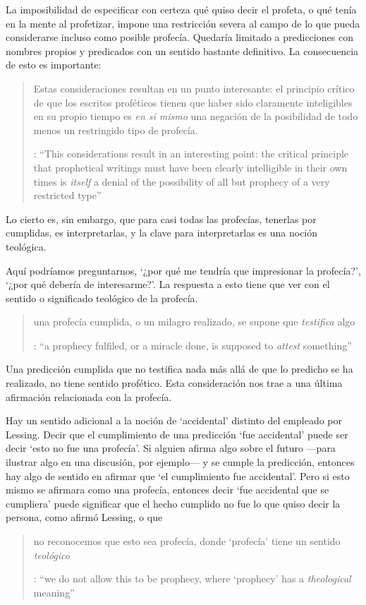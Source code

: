 La imposibilidad de especificar con certeza qué quiso decir el profeta, o qué tenía en la mente al profetizar, impone una restricción severa al campo de lo que pueda considerarse incluso como posible profecía. Quedaría limitado a predicciones con nombres propios y predicados con un sentido bastante definitivo. La consecuencia de esto es importante: \blockquote[{\cite[31]{anscombe2008faith:prophandmi}}: \enquote{This considerations result in an interesting point: the critical principle that prophetical writings must have been clearly intelligible in their own times is \emph{itself} a denial of the possibility of all but prophecy of a very restricted type}]{Estas consideraciones resultan en un punto interesante: el principio crítico de que los escritos proféticos tienen que haber sido claramente inteligibles en su propio tiempo es \emph{en sí mismo} una negación de la posibilidad de todo menos un restringido tipo de profecía.} Lo cierto es, sin embargo, que para casi todas las profecías, tenerlas por cumplidas, es interpretarlas, y la clave para interpretarlas es una noción teológica.

Aquí podríamos preguntarnos, \enquote*{¿por qué me tendría que impresionar la profecía?}, \enquote*{¿por qué debería de interesarme?}. La respuesta a esto tiene que ver con el sentido o significado teológico de la profecía. \blockquote[{\cite[32]{anscombe2008faith:prophandmi}}: \enquote{a prophecy fulfiled, or a miracle done, is supposed to \emph{attest} something}]{una profecía cumplida, o un milagro realizado, se supone que \emph{testifica} algo}. Una predicción cumplida que no testifica nada más allá de que lo predicho se ha realizado, no tiene sentido profético. Esta consideración nos trae a una última afirmación relacionada con la profecía.

Hay un sentido adicional a la noción de `accidental' distinto del empleado por Lessing. Decir que el cumplimiento de una predicción \enquote*{fue accidental} puede ser decir \enquote*{esto no fue una profecía}. Si alguien afirma algo sobre el futuro ---para ilustrar algo en una discusión, por ejemplo--- y se cumple la predicción, entonces hay algo de sentido en afirmar que \enquote*{el cumplimiento fue accidental}. Pero si esto mismo se afirmara como una profecía, entonces decir \enquote*{fue accidental que se cumpliera} puede significar que el hecho cumplido no fue lo que quiso decir la persona, como afirmó Lessing, o que \blockquote[{\cite[34]{anscombe2008faith:prophandmi}}: \enquote{we do not allow this to be prophecy, where `prophecy' has a \emph{theological} meaning}]{no reconocemos que esto sea profecía, donde `profecía' tiene un sentido \emph{teológico}}.

